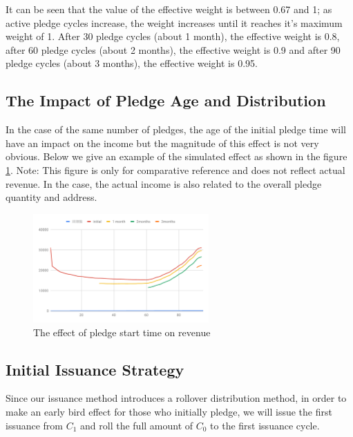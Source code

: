 It can be seen that the value of the effective weight is between 0.67 and 1; as active pledge cycles increase, the weight increases until it reaches it's maximum weight of 1. After 30 pledge cycles (about 1 month), the effective weight is 0.8, after 60 pledge cycles (about 2 months), the effective weight is 0.9 and after 90 pledge cycles (about 3 months), the effective weight is 0.95.

\subsection{The Impact of Pledge Age and Distribution}
In the case of the same number of pledges, the age of the initial pledge time will have an impact on the income but the magnitude of this effect is not very obvious. Below we give an example of the simulated effect as shown in the figure \ref{fig:compare}. Note: This figure is only for comparative reference and does not reflect actual revenue. In the case, the actual income is also related to the overall pledge quantity and address.
\begin{figure}[htbp]
  \centering
    \includegraphics[width=0.6\textwidth]{../common/compare.pdf}
    \caption{The effect of pledge start time on revenue\label{fig:compare}}
\end{figure}

\subsection{Initial Issuance Strategy}
Since our issuance method introduces a rollover distribution method, in order to make an early bird effect for those who initially pledge, we will issue the first issuance from $C_1$ and roll the full amount of $C_0$ to the first issuance cycle.
